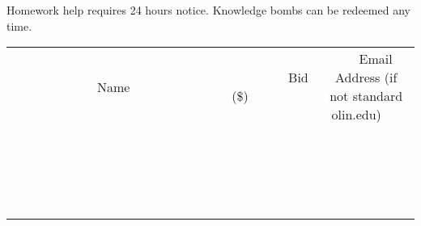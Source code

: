 \documentclass[11pt]{article}
\begin{document}
Homework help requires 24 hours notice. Knowledge bombs can be redeemed any time.
\\[3ex]
\begin{tabular}{c c c}
~~~~~~~~~~~~~Name~~~~~~~~~~~~~ & ~~~~~~~~~Bid (\$)~~~~~~~~~  & ~~~Email Address (if not standard olin.edu)~~~\\
 & & \\
\hline
 & & \\
\hline
 & & \\
\hline
 & & \\
\hline
 & & \\
\hline
 & & \\
\hline
 & & \\
\hline
 & & \\
\hline
 & & \\
\hline
 & & \\
\hline
 & & \\
\hline
 & & \\
\hline
 & & \\
\hline
 & & \\
\hline
 & & \\
\hline
 & & \\
\hline
 & & \\
\hline
 & & \\
\hline
 & & \\
\hline
\end{tabular}
\newpage
\end{document}
